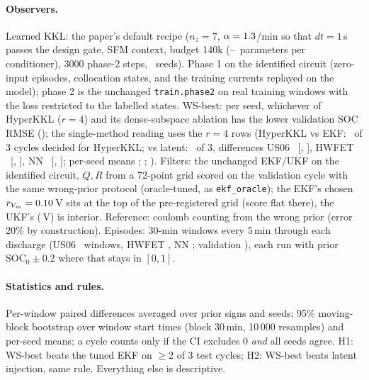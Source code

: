 \paragraph{Observers.} Learned KKL: the paper's default recipe ($n_z=7$, $\alpha=1.3$/min so that $dt=1$\,s passes the design gate, SFM context, budget 140k (\RealParamsMin--\RealParamsMax\ parameters per conditioner), 3000 phase-2 steps, \RealNSeeds\ seeds). Phase 1 on the identified circuit (zero-input episodes, collocation states, and the training currents replayed on the model); phase 2 is the unchanged \texttt{train.phase2} on real training windows with the loss restricted to the labelled states. WS-best: per seed, whichever of HyperKKL ($r=4$) and its dense-subspace ablation has the lower validation SOC RMSE (\RealWsChoice); the single-method reading uses the $r=4$ rows (HyperKKL vs EKF: \RealLoraEkfCyclesABetter\ of 3 cycles decided for HyperKKL; vs latent: \RealLoraLatentCyclesABetter\ of 3, differences US06 \RealLoraLatentUSZeroSixDiff\ [\RealLoraLatentUSZeroSixCiLo, \RealLoraLatentUSZeroSixCiHi], HWFET \RealLoraLatentHWFETDiff\ [\RealLoraLatentHWFETCiLo, \RealLoraLatentHWFETCiHi], NN \RealLoraLatentNNDiff\ [\RealLoraLatentNNCiLo, \RealLoraLatentNNCiHi]; per-seed means \RealLoraLatentUSZeroSixSeeds; \RealLoraLatentHWFETSeeds; \RealLoraLatentNNSeeds). Filters: the unchanged EKF/UKF on the identified circuit, $Q,R$ from a 72-point grid scored on the validation cycle with the same wrong-prior protocol (oracle-tuned, as \texttt{ekf\_oracle}); the EKF's chosen $r_{V_m}=0.10$\,V sits at the top of the pre-registered grid (score flat there), the UKF's (\RealUkfRvm\,V) is interior. Reference: coulomb counting from the wrong prior (error 20\% by construction). Episodes: 30-min windows every 5\,min through each discharge (US06 \RealNwinUsZeroSix\ windows, HWFET \RealNwinHwfet, NN \RealNwinNn; validation \RealNwinVal), each run with prior $\mathrm{SOC}_0\pm0.2$ where that stays in $[0,1]$.

\paragraph{Statistics and rules.} Per-window paired differences averaged over prior signs and seeds; 95\% moving-block bootstrap over window start times (block 30\,min, 10\,000 resamples) and per-seed means; a cycle counts only if the CI excludes 0 \emph{and} all seeds agree. H1: WS-best beats the tuned EKF on $\ge2$ of 3 test cycles; H2: WS-best beats latent injection, same rule. Everything else is descriptive.

